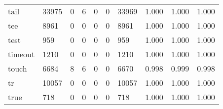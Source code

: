 \begin{longtable}{lp{2.0cm}p{2.0cm}p{2.0cm}p{2.0cm}p{2.0cm}p{2.0cm}p{2.0cm}p{2.0cm}p{2.0cm}}
tail      &                  33975 &                                  0 &                                 6 &                                0 &                                 0 &                           33969 &                                1.000 &                                  1.000 &                                1.000 \\
tee       &                   8961 &                                  0 &                                 0 &                                0 &                                 0 &                            8961 &                                1.000 &                                  1.000 &                                1.000 \\
test      &                    959 &                                  0 &                                 0 &                                0 &                                 0 &                             959 &                                1.000 &                                  1.000 &                                1.000 \\
timeout   &                   1210 &                                  0 &                                 0 &                                0 &                                 0 &                            1210 &                                1.000 &                                  1.000 &                                1.000 \\
touch     &                   6684 &                                  8 &                                 6 &                                0 &                                 0 &                            6670 &                                0.998 &                                  0.999 &                                0.998 \\
tr        &                  10057 &                                  0 &                                 0 &                                0 &                                 0 &                           10057 &                                1.000 &                                  1.000 &                                1.000 \\
true      &                    718 &                                  0 &                                 0 &                                0 &                                 0 &                             718 &                                1.000 &                                  1.000 &                                1.000 \\

\end{longtable}
